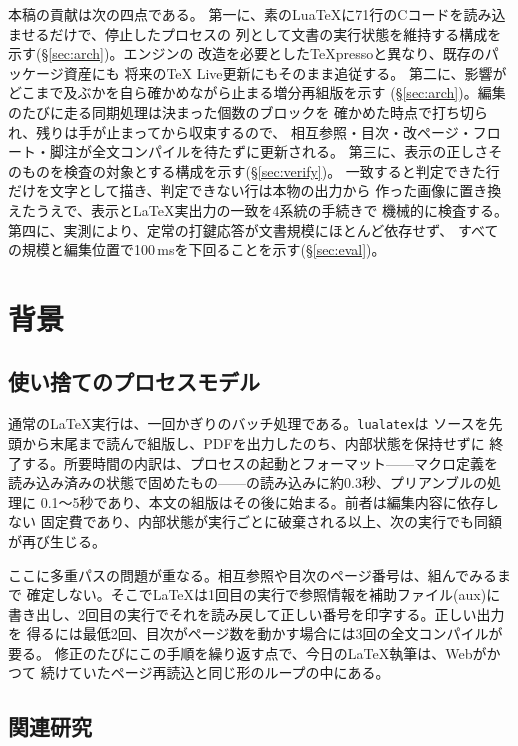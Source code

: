 \documentclass[a4paper,11pt]{ltjsarticle}
\newcommand{\code}[1]{\texttt{#1}}
\begin{document}
本稿の貢献は次の四点である。
第一に、素のLuaTeXに71行のCコードを読み込ませるだけで、停止したプロセスの
列として文書の実行状態を維持する構成を示す(\S\ref{sec:arch})。エンジンの
改造を必要としたTeXpresso\cite{bour2023}と異なり、既存のパッケージ資産にも
将来のTeX Live更新にもそのまま追従する。
第二に、影響がどこまで及ぶかを自ら確かめながら止まる増分再組版を示す
(\S\ref{sec:arch})。編集のたびに走る同期処理は決まった個数のブロックを
確かめた時点で打ち切られ、残りは手が止まってから収束するので、
相互参照・目次・改ページ・フロート・脚注が全文コンパイルを待たずに更新される。
第三に、表示の正しさそのものを検査の対象とする構成を示す(\S\ref{sec:verify})。
一致すると判定できた行だけを文字として描き、判定できない行は本物の出力から
作った画像に置き換えたうえで、表示と\LaTeX{}実出力の一致を4系統の手続きで
機械的に検査する。
第四に、実測により、定常の打鍵応答が文書規模にほとんど依存せず、
すべての規模と編集位置で100\,msを下回ることを示す(\S\ref{sec:eval})。

\section{背景}\label{sec:background}

\subsection{使い捨てのプロセスモデル}

通常の\LaTeX{}実行は、一回かぎりのバッチ処理である。\code{lualatex}は
ソースを先頭から末尾まで読んで組版し、PDFを出力したのち、内部状態を保持せずに
終了する。所要時間の内訳は、プロセスの起動とフォーマット——マクロ定義を
読み込み済みの状態で固めたもの——の読み込みに約0.3秒、プリアンブルの処理に
0.1〜5秒であり、本文の組版はその後に始まる。前者は編集内容に依存しない
固定費であり、内部状態が実行ごとに破棄される以上、次の実行でも同額が再び生じる。

ここに多重パスの問題が重なる。相互参照や目次のページ番号は、組んでみるまで
確定しない。そこで\LaTeX{}は1回目の実行で参照情報を補助ファイル(aux)に
書き出し、2回目の実行でそれを読み戻して正しい番号を印字する。正しい出力を
得るには最低2回、目次がページ数を動かす場合には3回の全文コンパイルが要る。
修正のたびにこの手順を繰り返す点で、今日の\LaTeX{}執筆は、Webがかつて
続けていたページ再読込と同じ形のループの中にある。

\subsection{関連研究}
\end{document}
